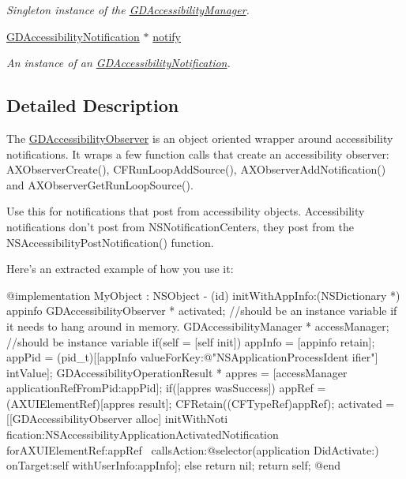 \begin{DoxyCompactItemize}
\begin{DoxyCompactList}\small\item\em Singleton instance of the \hyperlink{interface_g_d_accessibility_manager}{GDAccessibilityManager}. \item\end{DoxyCompactList}\item 
\hypertarget{interface_g_d_accessibility_observer_ac10d3d1ce12d457cf53ac6bb3d86c380}{
\hyperlink{interface_g_d_accessibility_notification}{GDAccessibilityNotification} $\ast$ \hyperlink{interface_g_d_accessibility_observer_ac10d3d1ce12d457cf53ac6bb3d86c380}{notify}}
\label{interface_g_d_accessibility_observer_ac10d3d1ce12d457cf53ac6bb3d86c380}

\begin{DoxyCompactList}\small\item\em An instance of an \hyperlink{interface_g_d_accessibility_notification}{GDAccessibilityNotification}. \item\end{DoxyCompactList}\end{DoxyCompactItemize}


\subsection{Detailed Description}
The \hyperlink{interface_g_d_accessibility_observer}{GDAccessibilityObserver} is an object oriented wrapper around accessibility notifications. It wraps a few function calls that create an accessibility observer: AXObserverCreate(), CFRunLoopAddSource(), AXObserverAddNotification() and AXObserverGetRunLoopSource().

Use this for notifications that post from accessibility objects. Accessibility notifications don't post from NSNotificationCenters, they post from the NSAccessibilityPostNotification() function.

Here's an extracted example of how you use it: 
\begin{DoxyCode}
 @implementation MyObject : NSObject
 - (id) initWithAppInfo:(NSDictionary *) appinfo {
        GDAccessibilityObserver * activated; //should be an instance variable if 
      it needs to hang around in memory.
        GDAccessibilityManager * accessManager; //should be instance variable
        if(self = [self init]) {
                appInfo = [appinfo retain];
                appPid = (pid_t)[[appInfo valueForKey:@"NSApplicationProcessIdent
      ifier"] intValue];
                GDAccessibilityOperationResult * appres = [accessManager 
      applicationRefFromPid:appPid];
                if([appres wasSuccess]) {
                        appRef = (AXUIElementRef)[appres result];
                        CFRetain((CFTypeRef)appRef);
                        activated = [[GDAccessibilityObserver alloc] initWithNoti
      fication:NSAccessibilityApplicationActivatedNotification forAXUIElementRef:appRef
       \
                                                callsAction:@selector(application
      DidActivate:) onTarget:self withUserInfo:appInfo];
                } else {
                        return nil;
                }
        }
        return self;
 }
 @end
\end{DoxyCode}


